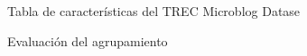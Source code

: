 \begin{frame}
Tabla de características del TREC Microblog Datase
\end{frame}

\begin{frame}{Evaluación del agrupamiento}


\end{frame}